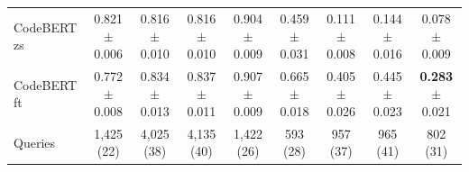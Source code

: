 \begin{table}[!htbp]
\begin{tabular}{lcccccccc}
\quad CodeBERT zs & 0.821$\pm$0.006 & 0.816$\pm$0.010 & 0.816$\pm$0.010 & 0.904$\pm$0.009 & 0.459$\pm$0.031 & 0.111$\pm$0.008 & 0.144$\pm$0.016 & 0.078$\pm$0.009 \\
\quad CodeBERT ft & 0.772$\pm$0.008 & 0.834$\pm$0.013 & 0.837$\pm$0.011 & 0.907$\pm$0.009 & 0.665$\pm$0.018 & 0.405$\pm$0.026 & 0.445$\pm$0.023 & \textbf{0.283}$\pm$0.021 \\
\midrule
Queries & 1,425 (22) & 4,025 (38) & 4,135 (40) & 1,422 (26) & 593 (28) & 957 (37) & 965 (41) & 802 (31) \\
\bottomrule
\end{tabular}
\end{table}
